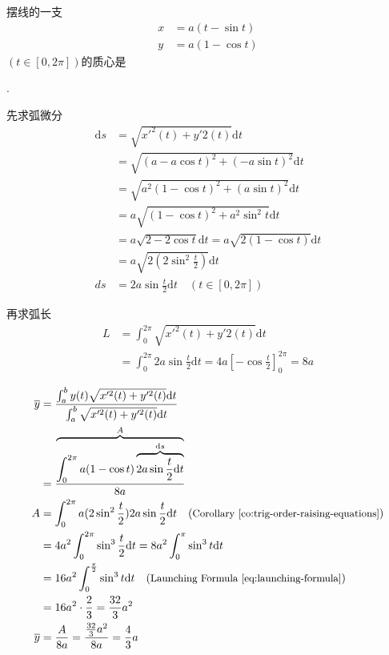 \begin{example}
    \label{ex:centriod-of-curve}
    摆线的一支 
    \begin{align*}
        x &= a(t - \sin t) \\
        y &= a(1 - \cos t) 
    \end{align*}
    $(t \in [0, 2\pi])$的质心是
    
    \cite[question 208]{w660}.

    先求弧微分
    \begin{align*}
        \mathrm ds &= \sqrt{x'^2(t) + y'2(t)} \mathrm dt \\
                   &= \sqrt{(a - a\cos t)^2 + (-a \sin t)^2} \mathrm dt \\
                   &= \sqrt{a^2(1-\cos t)^2 + (a \sin t)^2} \mathrm dt \\
                   &= a\sqrt{(1 - \cos t)^2 + a^2 \sin^2 t} \mathrm dt \\
                   &= a\sqrt{2 - 2 \cos t} \mathrm dt = a\sqrt{2(1 - \cos t)} \mathrm dt \\
                   &= a\sqrt{2(2 \sin^2 \frac{t}{2})} \mathrm dt \\
                ds &= 2a \sin \frac{t}{2} \mathrm dt \quad (t \in [0, 2\pi])
    \end{align*}

    再求弧长
    \begin{align*}
        L&=\int_0^{2 \pi} \sqrt{x'^2(t) + y'2(t)} \mathrm dt \\
         &=\int_0^{2 \pi} 2a \sin \frac{t}{2} \mathrm dt = 4a \left[-\cos \frac{t}{2}\right]^{2\pi}_0 = 8a
    \end{align*}

    \begin{align*}
        \overline y &= \dfrac{
                           \int_a^b y(t) \sqrt{x'^2(t) + y'^2(t)} \mathrm dt 
                       }{
                           \int_a^b \sqrt{x'^2(t) + y'^2(t)} \mathrm dt
                       } \\
                    &= \frac{\overbrace{\int_0^{2 \pi} a(1-\cos t) \overbrace{2a \sin \frac{t}{2} \mathrm dt}^{\mathrm ds}}^{A}}{8a} \\
                  A &= \int_0^{2 \pi} a(2 \sin^2 \frac{t}{2}) 2a \sin \frac{t}{2} \mathrm dt \quad (\mbox{\small Corollary \ref{co:trig-order-raising-equations}})\\
                    &= 4a^2 \int_0^{2\pi} \sin^3 \frac{t}{2} \mathrm dt = 8a^2 \int_0^{\pi} \sin^3 t \mathrm dt \\
                    &= 16a^2 \int_0^{\frac{\pi}{2}} \sin^3 t \mathrm dt \quad (\mbox{\small Launching Formula \ref{eq:launching-formula}})\\
                    &= 16a^2 \cdot \frac{2}{3} = \frac{32}{3}a^2\\
        \overline y &= \frac{A}{8a} = \frac{\frac{32}{3}a^2}{8a} = \frac{4}{3}a
    \end{align*}


\end{example}
